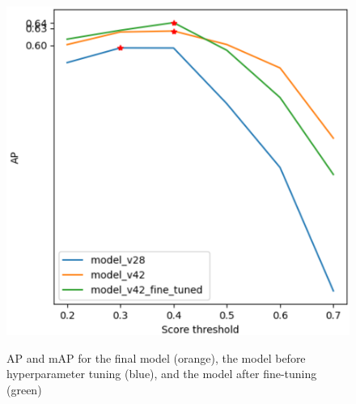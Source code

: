 \begin{figure}[htp]
{        \includegraphics[scale=\scalevartuning]{images/final_car.png}%
        \label{car_final}%
        }%
     \hfill%
    \caption{AP and mAP for the final model (orange), the model before hyperparameter tuning (blue), and the model after fine-tuning (green)}
    \label{curve_final}
    \end{figure}



